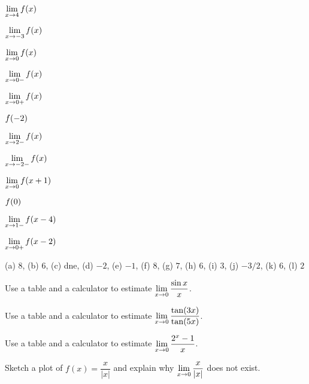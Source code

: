 \begin{exercises}
\begin{exercise}
\begin{marginfigure}
\caption{A piecewise defined function.}
\label{plot:piecewise-exercise}
\end{marginfigure}
\begin{enumerate}
\begin{multicols}{3}
\item $\displaystyle \lim_{x\to 4} f(x)$  
\item $\displaystyle \lim_{x\to -3} f(x)$  
\item $\displaystyle \lim_{x\to 0} f(x)$ 
\item $\displaystyle \lim_{x\to 0-} f(x)$  
\item $\displaystyle \lim_{x\to 0+} f(x)$  
\item $\displaystyle f(-2)$  
\item $\displaystyle \lim_{x\to 2-} f(x)$  
\item $\displaystyle \lim_{x\to -2-} f(x)$  
\item $\displaystyle \lim_{x\to 0} f(x+1)$  
\item $\displaystyle f(0)$ 
\item $\displaystyle \lim_{x\to 1-} f(x-4)$  
\item $\displaystyle \lim_{x\to 0+} f(x-2)$
\end{multicols}  
\end{enumerate}
\begin{answer} (a) $8$, (b) $6$, (c) dne, (d) $-2$, (e) $-1$, (f) $8$,
 (g) $7$, (h) $6$, (i) $3$, (j) $-3/2$, (k) $6$, (l) $2$
\end{answer}
\end{exercise}


\begin{exercise} 
Use a table and a calculator to estimate $\displaystyle\lim_{x\to 0} {\sin
  x\over x}$.
\end{exercise}

\begin{exercise} 
Use a table and a calculator to estimate $\displaystyle\lim_{x\to
  0}\frac{\tan(3x)}{\tan(5x)}$.
\end{exercise}

\begin{exercise} 
Use a table and a calculator to estimate $\displaystyle\lim_{x\to 0}
\frac{2^x-1}{x}$.
\end{exercise}


\begin{exercise} 
Sketch a plot of $f(x) = \dfrac{x}{|x|}$ and explain why $\displaystyle
\lim_{x\to 0} \frac{x}{|x|}$ does not exist.
\end{exercise}




\end{exercises}
